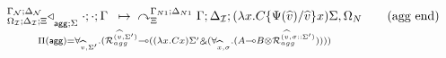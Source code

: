 
\[
\underset{
   \Pi(\m{agg}) = \forall_{\widehat{v}, \Sigma'}.
   (\defstwo{agg}{\widehat{v}}{\Sigma'} \lolli ((\lambda x. C x)\Sigma' \with (\forall_{\widehat{x}, \sigma}.
                                                (A \lolli B \otimes
                                                 \defstwo{agg}{\widehat{v}}{\sigma
                                                 ::\Sigma'}))))
}
{
\trans{
   \contstatea{\deltan}{\cdot ; \cdot}{\Gamma}{\Sigma}
}
{
   \derstatex{\Gamma}{\deltan}{\Xi}{\Gamma_{N1}}{\Delta_{N1}}{(\lambda x.
         C\{\Psi(\widehat{v})/\widehat{v}\} x) \Sigma,
      \Omega_N}
}
} \tag{agg end}
\]
